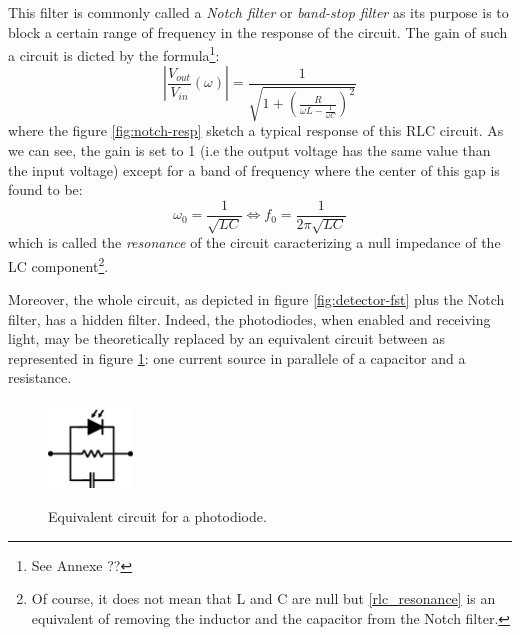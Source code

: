 \documentclass[10pt]{report}
\begin{document}
This filter is commonly called a \textit{Notch filter} or \textit{band-stop filter} as its purpose is to block a certain range of frequency in the response of the circuit. The gain of such a circuit is dicted by the formula\footnote{See Annexe ??}:
\begin{equation}
\left\lvert \frac{V_{out}}{V_{in}} (\omega) \right\rvert = \frac{1}{\sqrt{1 + \left(\frac{R}{\omega L - \frac{1}{\omega C}}\right)^2}}
\end{equation}
where the figure \ref{fig:notch-resp} sketch a typical response of this RLC circuit. As we can see, the gain is set to 1 (i.e the output voltage has the same value than the input voltage) except for a band of frequency where the center of this gap is found to be:
\begin{equation}
\label{rlc_resonance}
\omega_0 = \frac{1}{\sqrt{LC}} \Leftrightarrow f_0 = \frac{1}{2\pi\sqrt{LC}}
\end{equation}
which is called the \textit{resonance} of the circuit caracterizing a null impedance of the LC component\footnote{Of course, it does not mean that L and C are null but \eqref{rlc_resonance} is an equivalent of removing the inductor and the capacitor from the Notch filter.}.

Moreover, the whole circuit, as depicted in figure \ref{fig:detector-fst} plus the Notch filter, has a hidden filter. Indeed, the photodiodes, when enabled and receiving light, may be theoretically replaced by an equivalent circuit between as represented in figure \ref{fig:equiv-diode}: one current source in parallele of a capacitor and a resistance.

\begin{figure}[h!]
\caption{Equivalent circuit for a photodiode.}
\centering
\includegraphics[width=0.2\textwidth]{equiv-diode}
\label{fig:equiv-diode}
\end{figure}
\end{document}
